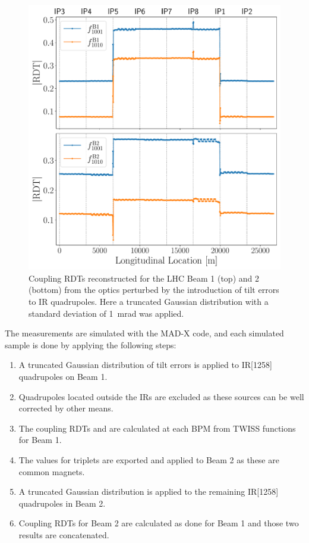 \begin{figure}[!htb]
    \centering
    \includegraphics*[width=0.99\columnwidth]{Figures/ML_for_IR_Coupling/example_coupling_rdts.pdf}
    \caption{Coupling RDTs reconstructed for the LHC Beam 1 (top) and 2 (bottom) from the optics perturbed by the introduction of tilt errors to IR quadrupoles. Here a truncated Gaussian distribution with a standard deviation of \qty{1}{\milli\radian} was applied.}
    \label{fig:example_coupling_rdts}
\end{figure}

The measurements are simulated with the MAD-X code, and each simulated sample is done by applying the following steps:

\begin{enumerate}
    \item A truncated Gaussian distribution of tilt errors \DPSI is applied to IR[1258] quadrupoles on Beam 1.
    \item Quadrupoles located outside the IRs are excluded as these sources can be well corrected by other means.
    \item The coupling RDTs \foneohone and \foneohoneoh are calculated at each BPM from TWISS functions for Beam 1.
    \item The \DPSI values for triplets are exported and applied to Beam 2 as these are common magnets.
    \item A truncated Gaussian distribution is applied to the remaining IR[1258] quadrupoles in Beam 2.
    \item Coupling RDTs for Beam 2 are calculated as done for Beam 1 and those two results are concatenated.
\end{enumerate}

